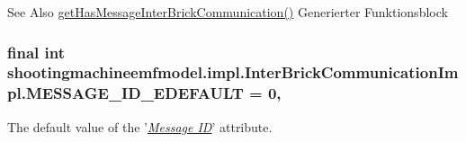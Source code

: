 \begin{DoxySeeAlso}{See Also}
\hyperlink{classshootingmachineemfmodel_1_1impl_1_1_inter_brick_communication_impl_ac39dee92ed6a0c0e6a4c3df0b7a68f26}{get\-Has\-Message\-Inter\-Brick\-Communication()} Generierter Funktionsblock  
\end{DoxySeeAlso}
\hypertarget{classshootingmachineemfmodel_1_1impl_1_1_inter_brick_communication_impl_a7bc71e77fb5709025d118e5488d34663}{
\subsubsection[{M\-E\-S\-S\-A\-G\-E\-\_\-\-I\-D\-\_\-\-E\-D\-E\-F\-A\-U\-L\-T}]{\setlength{\rightskip}{0pt plus 5cm}final int shootingmachineemfmodel.\-impl.\-Inter\-Brick\-Communication\-Impl.\-M\-E\-S\-S\-A\-G\-E\-\_\-\-I\-D\-\_\-\-E\-D\-E\-F\-A\-U\-L\-T = 0\hspace{0.3cm}{\ttfamily [static]}, {\ttfamily [protected]}}}\label{classshootingmachineemfmodel_1_1impl_1_1_inter_brick_communication_impl_a7bc71e77fb5709025d118e5488d34663}
The default value of the '\hyperlink{classshootingmachineemfmodel_1_1impl_1_1_inter_brick_communication_impl_ace5e994ef218bf1074d002ebaef563b0}{{\itshape Message I\-D}}' attribute.

